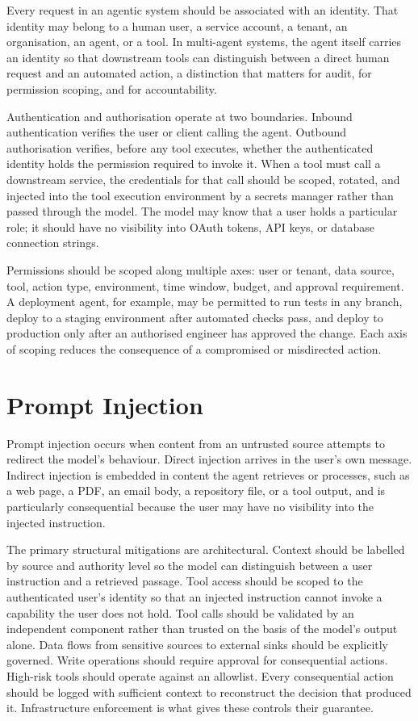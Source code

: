 Every request in an agentic system should be associated with an identity. That identity
may belong to a human user, a service account, a tenant, an organisation, an agent, or
a tool. In multi-agent systems, the agent itself carries an identity so that downstream
tools can distinguish between a direct human request and an automated action, a
distinction that matters for audit, for permission scoping, and for accountability.

Authentication and authorisation operate at two boundaries. Inbound authentication
verifies the user or client calling the agent. Outbound authorisation verifies, before
any tool executes, whether the authenticated identity holds the permission required to
invoke it. When a tool must call a downstream service, the credentials for that call
should be scoped, rotated, and injected into the tool execution environment by a secrets
manager rather than passed through the model. The model may know that a user holds a
particular role; it should have no visibility into OAuth tokens, API keys, or database
connection strings.

Permissions should be scoped along multiple axes: user or tenant, data source, tool,
action type, environment, time window, budget, and approval requirement. A deployment
agent, for example, may be permitted to run tests in any branch, deploy to a staging
environment after automated checks pass, and deploy to production only after an
authorised engineer has approved the change. Each axis of scoping reduces the consequence
of a compromised or misdirected action.

\section{Prompt Injection}

Prompt injection occurs when content from an untrusted source attempts to redirect the
model's behaviour. Direct injection arrives in the user's own message. Indirect injection
is embedded in content the agent retrieves or processes, such as a web page, a PDF, an email
body, a repository file, or a tool output, and is particularly consequential because the
user may have no visibility into the injected instruction.

The primary structural mitigations are architectural. Context should be labelled by
source and authority level so the model can distinguish between a user instruction and a
retrieved passage. Tool access should be scoped to the authenticated user's identity so
that an injected instruction cannot invoke a capability the user does not hold. Tool
calls should be validated by an independent component rather than trusted on the basis
of the model's output alone. Data flows from sensitive sources to external sinks should
be explicitly governed. Write operations should require approval for consequential
actions. High-risk tools should operate against an allowlist. Every consequential action
should be logged with sufficient context to reconstruct the decision that produced it.
Infrastructure enforcement is what gives these controls their guarantee.


